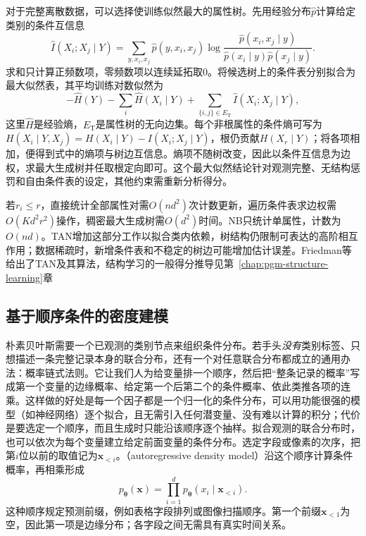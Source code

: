 对于完整离散数据，可以选择使训练似然最大的属性树。先用经验分布$\widehat p$计算给定类别的条件互信息
\[
  \widehat I(X_i;X_j\mid Y)=
  \sum_{y,x_i,x_j}\widehat p(y,x_i,x_j)
  \log\frac{\widehat p(x_i,x_j\mid y)}
                 {\widehat p(x_i\mid y)\widehat p(x_j\mid y)}.
\]
求和只计算正频数项，零频数项以连续延拓取$0$。将候选树上的条件表分别拟合为最大似然表，其平均训练对数似然为
\begin{equation}
  \label{eq:pgm-static-directed-tan-score}
  -\widehat H(Y)-\sum_i\widehat H(X_i\mid Y)
  +\sum_{\{i,j\}\in E_{\mathrm{T}}}
       \widehat I(X_i;X_j\mid Y),
\end{equation}
这里$\widehat H$是经验熵，$E_{\mathrm T}$是属性树的无向边集。每个非根属性的条件熵可写为$H(X_i\mid Y,X_j)=H(X_i\mid Y)-I(X_i;X_j\mid Y)$，根仍贡献$H(X_r\mid Y)$；将各项相加，便得到式中的熵项与树边互信息。熵项不随树改变，因此以条件互信息为边权，求最大生成树并任取根定向即可。这个最大似然结论针对观测完整、无结构惩罚和自由条件表的设定，其他约束需重新分析得分。

若$r_i\le r$，直接统计全部属性对需$O(nd^2)$次计数更新，遍历条件表求边权需$O(Kd^2r^2)$操作，稠密最大生成树需$O(d^2)$时间。NB只统计单属性，计数为$O(nd)$。TAN增加这部分工作以拟合类内依赖，树结构仍限制可表达的高阶相互作用；数据稀疏时，新增条件表和不稳定的树边可能增加估计误差。Friedman等给出了TAN及其算法，结构学习的一般得分推导见第~\ref{chap:pgm-structure-learning}章

\subsection{基于顺序条件的密度建模}
\label{sec:pgm-static-directed-autoregressive}

朴素贝叶斯需要一个已观测的类别节点来组织条件分布。若手头\emph{没有}类别标签、只想描述一条完整记录本身的联合分布，还有一个对任意联合分布都成立的通用办法：概率链式法则。它让我们人为给变量排一个顺序，然后把“整条记录的概率”写成第一个变量的边缘概率、给定第一个后第二个的条件概率、依此类推各项的连乘。这样做的好处是每一个因子都是一个归一化的条件分布，可以用功能很强的模型（如神经网络）逐个拟合，且无需引入任何潜变量、没有难以计算的积分；代价是要选定一个顺序，而且生成时只能沿该顺序逐个抽样。拟合观测的联合分布时，也可以依次为每个变量建立给定前面变量的条件分布。选定字段或像素的次序，把第$i$位以前的取值记为$\bm x_{<i}$。（autoregressive density model）沿这个顺序计算条件概率，再相乘形成
\begin{equation}
  \label{eq:pgm-static-directed-ar}
  p_{\bm{\theta}}(\bm{x})
    =\prod_{i=1}^{d}p_{\bm{\theta}}(x_i\mid\bm{x}_{<i}).
\end{equation}
这种顺序规定预测前缀，例如表格字段排列或图像扫描顺序。第一个前缀$\bm x_{<1}$为空，因此第一项是边缘分布；各字段之间无需具有真实时间关系。

